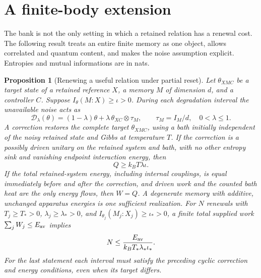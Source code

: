 \documentclass[12pt,a4paper]{article}
\newtheorem{proposition}{Proposition}
\begin{document}
\section{A finite-body extension}

The bank is not the only setting in which a retained relation has a renewal cost. The following result treats an entire finite memory as one object, allows correlated and quantum content, and makes the noise assumption explicit. Entropies and mutual informations are in nats.

\begin{proposition}[Renewing a useful relation under partial reset]
\label{prop:body}
Let $\theta_{XMC}$ be a target state of a retained reference $X$, a memory $M$ of dimension $d$, and a controller $C$. Suppose $I_\theta(M:X)\ge\iota>0$. During each degradation interval the unavailable noise acts as
\[
 \mathcal D_\lambda(\theta)
 =(1-\lambda)\theta+
 \lambda\,\theta_{XC}\otimes\tau_M,\qquad
 \tau_M=I_M/d,\quad 0<\lambda\le1.
\]
A correction restores the complete target $\theta_{XMC}$, using a bath initially independent of the noisy retained state and Gibbs at temperature $T$. If the correction is a possibly driven unitary on the retained system and bath, with no other entropy sink and vanishing endpoint interaction energy, then
\begin{equation}\label{eq:heatbody}
 Q\ge k_BT\lambda\iota.
\end{equation}
If the total retained-system energy, including internal couplings, is equal immediately before and after the correction, and driven work and the counted bath heat are the only energy flows, then $W=Q$. A degenerate memory with additive, unchanged apparatus energies is one sufficient realization. For $N$ renewals with $T_j\ge T_*>0$, $\lambda_j\ge\lambda_*>0$, and $I_{\theta_j}(M_j:X_j)\ge\iota_*>0$, a finite total supplied work $\sum_j W_j\le E_{\rm av}$ implies
\begin{equation}\label{eq:number}
 N\le\frac{E_{\rm av}}{k_BT_*\lambda_*\iota_*}.
\end{equation}
For the last statement each interval must satisfy the preceding cyclic correction and energy conditions, even when its target differs.
\end{proposition}
\end{document}
